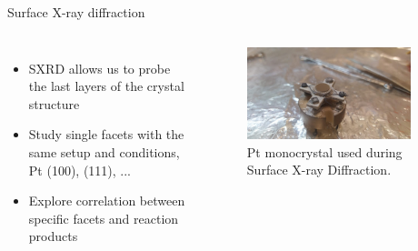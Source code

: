 \begin{frame}{Surface X-ray diffraction}
    \begin{columns}
        \centering
        \begin{itemize}
            \item SXRD allows us to probe the last layers of the crystal structure
            \vspace{0.25cm}
            \pause
            \item Study \textcolor{Important}{single facets} with the same setup and conditions, Pt (100), (111), ...
            \vspace{0.25cm}
            \pause
            \item \textcolor{Important}{Explore correlation between specific facets and reaction products}
        \end{itemize}

        \centering
        \pause
        \begin{figure}
            \centering
            \includegraphics[width=0.9\textwidth, trim={3.5cm 3.5cm 5cm 3.5cm}, clip]{Figures/sxrd_data/sample_sxrd.jpg}
            \caption{Pt monocrystal used during Surface X-ray Diffraction.}
            \label{fig:my_label}
        \end{figure}



\end{columns}
\end{frame}
